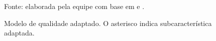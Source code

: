 \begin{figure}[htbp]
\centering

\caption{Modelo de qualidade adaptado. O asterisco indica subcaracterística adaptada.}
\label{fig:modelo-qualidade}
\par\smallskip
\scriptsize Fonte: elaborada pela equipe com base em \cite{iso25010_2023} e \cite{iso25010_2011}.
\end{figure}